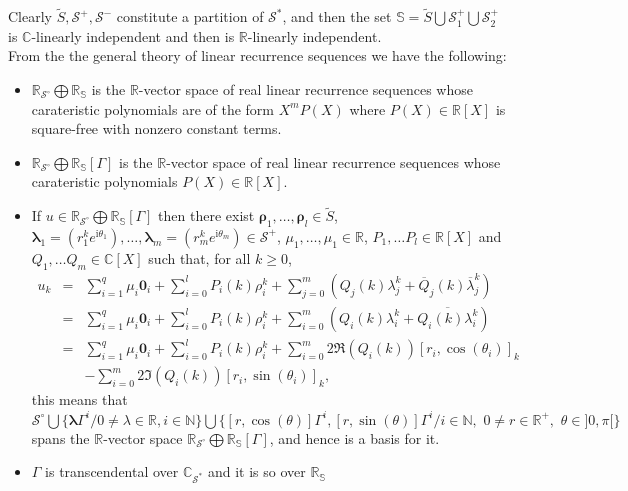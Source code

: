 \documentclass[12pt]{amsart}
\theoremstyle{definition}
\numberwithin{equation}{section}
\numberwithin{equation}{section}
\begin{document}
Clearly $\widetilde{S}, \mathcal{S}^{+}, \mathcal{S}^{-}$ constitute a partition of $\mathcal{S}^{\ast}$, and then the set $\mathbb{S}=\widetilde{S}\bigcup \mathcal{S}^{+}_{1}\bigcup \mathcal{S}^{+}_{2}$ is $\mathbb{C}$-linearly independent and then is $\mathbb{R}$-linearly independent.
\\From the the general theory of linear recurrence sequences we have the following:
\begin{itemize}
\item $\mathbb{R}_{\mathcal{S}^{\circ}}\bigoplus \mathbb{R}_{\mathbb{S}}$ is the $\mathbb{R}$-vector space of real linear recurrence sequences whose carateristic polynomials are of the form $X^{m}P(X)$ where $P(X)\in \mathbb{R}[X]$ is square-free with nonzero constant terms.
\item $\mathbb{R}_{\mathcal{S}^{\circ}}\bigoplus \mathbb{R}_{\mathbb{S}}[\Gamma]$ is the $\mathbb{R}$-vector space of real linear recurrence sequences whose carateristic polynomials $P(X)\in \mathbb{R}[X]$.
\item If $u\in \mathbb{R}_{\mathcal{S}^{\circ}}\bigoplus \mathbb{R}_{\mathbb{S}}[\Gamma]$ then there exist $\pmb{\rho}_{1},\ldots,\pmb{\rho}_{l}\in \widetilde{S}$, $\pmb{\lambda}_{1}=(r_{1}^{k}e^{\mathrm{i}\theta_{1}}),\ldots,\pmb{\lambda}_{m}=(r_{m}^{k}e^{\mathrm{i}\theta_{m}})\in \mathcal{S}^{+}$, $\mu_{1},\ldots,\mu_{1}\in \mathbb{R}$, $P_{1},\ldots P_{l}\in \mathbb{R}[X]$ and $Q_{1},\ldots Q_{m}\in \mathbb{C}[X]$ such that, for all $k\geq 0$,
    \begin{eqnarray*}
    u_{k}&=&\sum_{i=1}^{q}\mu_{i}\pmb{0}_{i}+\sum_{i=0}^{l}P_{i}(k)\rho_{i}^{k}+
    \sum_{j=0}^{m}(Q_{j}(k)\lambda_{j}^{k}+\overline{Q}_{j}(k)\overline{\lambda}_{j}^{k})\\
    &=&\sum_{i=1}^{q}\mu_{i}\pmb{0}_{i}+\sum_{i=0}^{l}P_{i}(k)\rho_{i}^{k}+
    \sum_{i=0}^{m}(Q_{i}(k)\lambda_{i}^{k}+\overline{Q_{i}(k)\lambda_{i}^{k}})\\
    &=&\sum_{i=1}^{q}\mu_{i}\pmb{0}_{i}+\sum_{i=0}^{l}P_{i}(k)\rho_{i}^{k}+
    \sum_{i=0}^{m}2\Re(Q_{i}(k))[r_{i},\cos(\theta_{i})]_{k}\\
    &&-\sum_{i=0}^{m}2\Im(Q_{i}(k))[r_{i},\sin(\theta_{i})]_{k},
    \end{eqnarray*}
this means that $\mathcal{S}^{\circ}\bigcup \{\pmb{\lambda}\Gamma^{i}/0\neq \lambda\in \mathbb{R}, i\in \mathbb{N}\}\bigcup \{[r,\cos(\theta)]\Gamma^{i}, [r,\sin(\theta)]\Gamma^{i}/ i\in \mathbb{N},\,\,0\neq r\in \mathbb{R}^{+},\,\, \theta\in ]0,\pi[\}$ spans the $\mathbb{R}$-vector space $\mathbb{R}_{\mathcal{S}^{\circ}}\bigoplus \mathbb{R}_{\mathbb{S}}[\Gamma]$, and hence is a basis for it.
\item $\Gamma$ is transcendental over $\mathbb{C}_{\mathcal{S}^{\ast}}$ and it is so over $\mathbb{R}_{\mathbb{S}}$
\end{itemize}
\end{document}
